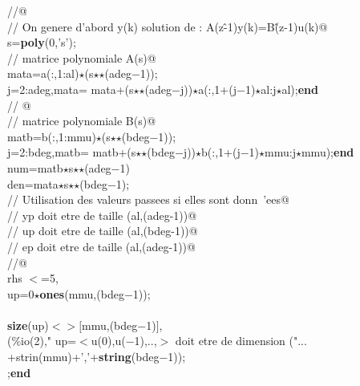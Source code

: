 {\begin{flushleft}
{\cmarg \verb@//@\\ 
\cmarg \verb@// On genere d'abord y(k) solution de : A(z\^-1)y(k)=B\^(z-1)u(k)@\\ 
\cmarg s={\bf poly}(0,'s');\\ 
\cmarg \verb@// matrice polynomiale A(s)@\\ 
\cmarg mata=a(:,1:al)$\star$(s$\star$$\star$(adeg$-$1));\\ 
 j=2:adeg,mata= mata+(s$\star$$\star$(adeg$-$j))$\star$a(:,1+(j$-$1)$\star$al:j$\star$al);{\bf end}\\ 
\cmarg \verb@// @\\ 
\cmarg \verb@// matrice polynomiale B(s)@\\ 
\cmarg matb=b(:,1:mmu)$\star$(s$\star$$\star$(bdeg$-$1));\\ 
 j=2:bdeg,matb= matb+(s$\star$$\star$(bdeg$-$j))$\star$b(:,1+(j$-$1)$\star$mmu:j$\star$mmu);{\bf end}\\ 
\cmarg num=matb$\star$s$\star$$\star$(adeg$-$1)\\ 
\cmarg den=mata$\star$s$\star$$\star$(bdeg$-$1);\\ 
\cmarg \verb@// Utilisation des valeurs passees si elles sont donn\ 'ees@\\ 
\cmarg \verb@// yp doit etre de taille (al,(adeg-1))@\\ 
\cmarg \verb@// up doit etre de taille (al,(bdeg-1))@\\ 
\cmarg \verb@// ep doit etre de taille (al,(adeg-1))@\\ 
\cmarg \verb@//@\\ 
 rhs $<$=5,\\ 
\cmarg \hspace{0.8cm}up=0$\star${\bf ones}(mmu,(bdeg$-$1));\\ 
 \\ 
\cmarg \hspace{0.8cm}{\bf if} {\bf size}(up)$<$$>$$[$mmu,(bdeg$-$1)$]$,\\ 
\cmarg \hspace{1.0cm}{\bf write}(\%io(2)," up=$<$u(0),u($-$1),..,$>$ doit etre de dimension ("...\\ 
\cmarg \hspace{1.0cm}+strin(mmu)+','+{\bf string}(bdeg$-$1));\\ 
\cmarg \hspace{1.0cm}{\bf return};{\bf end} \\ 
\\ 
}
\end{flushleft}}
